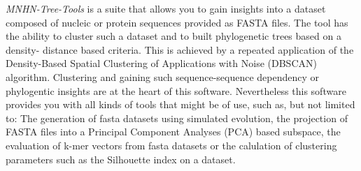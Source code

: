 \emph{MNHN-Tree-Tools} is a suite that allows you to gain insights
into a dataset composed of nucleic or protein sequences provided as
FASTA \cite{fasta} files. The tool has the ability to cluster such a
dataset and to built phylogenetic trees based on a density- distance
based criteria. This is achieved by a repeated application of the
Density-Based Spatial Clustering of Applications with Noise (DBSCAN)
\cite{dbscan} algorithm. Clustering and gaining such sequence-sequence
dependency or phylogentic insights are at the heart of this
software. Nevertheless this software provides you with all kinds of
tools that might be of use, such as, but not limited to: The
generation of fasta datasets using simulated evolution, the projection
of FASTA files into a Principal Component Analyses (PCA) based subspace, the
evaluation of k-mer vectors from fasta datasets or the calulation of
clustering parameters such as the Silhouette \cite{silhouette}
index on a dataset.
